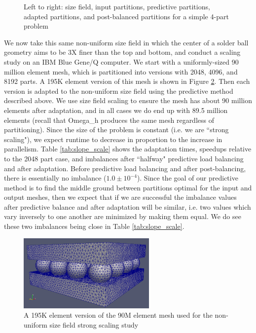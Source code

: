 \begin{figure}
\begin{center}
\caption{Left to right: size field, input partitions, predictive partitions,
adapted partitions, and post-balanced partitions
for a simple 4-part problem}
\label{fig:tall}
\end{center}
\end{figure}

We now take this same non-uniform size field in which the center of a solder
ball geometry aims to be 3X finer than the top and bottom, and conduct
a scaling study on an IBM Blue Gene/Q computer.
We start with a uniformly-sized 90 million element mesh, which is
partitioned into versions with 2048, 4096, and 8192 parts.
A 195K element version of this mesh is shown in Figure \ref{fig:slope_195k}.
Then each version is adapted to the non-uniform size field using
the predictive method described above.
We use size field scaling to ensure the mesh has about 90 million
elements after adaptation, and in all cases we do end up
with 89.5 million elements (recall that Omega\_h produces the
same mesh regardless of partitioning).
Since the size of the problem is constant (i.e. we are ``strong scaling"),
we expect runtime to decrease in proportion to the increase
in parallelism.
Table \ref{tab:slope_scale} shows the adaptation times,
speedups relative to the 2048 part case, and imbalances
after ``halfway" predictive load balancing and after
adaptation.
Before predictive load balancing and after post-balancing,
there is essentially no imbalance ($1.0\pm 10^{-4}$).
Since the goal of our predictive method is to find the middle
ground between partitions optimal for the input and output
meshes, then we expect that if we are successful the
imbalance values after predictive balance and after
adaptation will be similar, i.e. two values which
vary inversely to one another are minimized by making
them equal.
We do see these two imbalances being close in
Table \ref{tab:slope_scale}.

\begin{figure}
\begin{center}
\includegraphics[width=0.6\textwidth]{uniform_195k.png}
\caption{A 195K element version of the 90M element mesh
used for the non-uniform size field strong scaling study}
\label{fig:slope_195k}
\end{center}
\end{figure}

